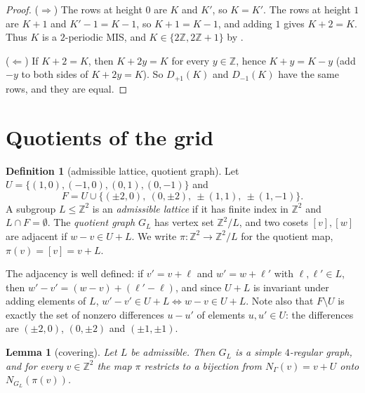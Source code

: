 \documentclass[11pt]{article}
\theoremstyle{plain}
\newtheorem{lemma}[lemma]{Lemma}
\theoremstyle{definition}
\newtheorem{definition}[definition]{Definition}
\theoremstyle{remark}
\newcommand{\Z}{\mathbb{Z}}
\newcommand{\Dg}[2]{D_{#1}(#2)}
\begin{document}
\begin{proof}
($\Rightarrow$) The rows at height $0$ are $K$ and $K'$, so $K = K'$. The rows at height $1$
are $K + 1$ and $K' - 1 = K - 1$, so $K + 1 = K - 1$, and adding $1$ gives $K + 2 = K$. Thus
$K$ is a $2$-periodic MIS, and $K \in \{2\Z, 2\Z+1\}$ by .

($\Leftarrow$) If $K + 2 = K$, then $K + 2y = K$ for every $y \in \Z$, hence
$K + y = K - y$ (add $-y$ to both sides of $K + 2y = K$). So $\Dg{+1}{K}$ and $\Dg{-1}{K}$
have the same rows, and they are equal.
\end{proof}

\section{Quotients of the grid}\label{sec:quotients}

\begin{definition}[admissible lattice, quotient graph]\label{def:quotient}
Let $U = \{(1,0), (-1,0), (0,1), (0,-1)\}$ and
\[
F = U \cup \{(\pm 2, 0),\ (0, \pm 2),\ \pm(1,1),\ \pm(1,-1)\}.
\]
A subgroup $L \le \Z^2$ is an \emph{admissible lattice} if it has finite index in $\Z^2$ and
$L \cap F = \emptyset$. The \emph{quotient graph} $G_L$ has vertex set $\Z^2/L$, and two
cosets $[v], [w]$ are adjacent if $w - v \in U + L$. We write $\pi : \Z^2 \to \Z^2/L$ for the
quotient map, $\pi(v) = [v] = v + L$.
\end{definition}

The adjacency is well defined: if $v' = v + \ell$ and $w' = w + \ell'$ with
$\ell, \ell' \in L$, then $w' - v' = (w - v) + (\ell' - \ell)$, and since $U + L$ is invariant
under adding elements of $L$, $w' - v' \in U + L \iff w - v \in U + L$. Note also that
$F \setminus U$ is exactly the set of nonzero differences $u - u'$ of elements
$u, u' \in U$: the differences are $(\pm 2, 0)$, $(0, \pm 2)$ and $(\pm 1, \pm 1)$.

\begin{lemma}[covering]\label{lem:covering}
Let $L$ be admissible. Then $G_L$ is a simple $4$-regular graph, and for every $v \in \Z^2$
the map $\pi$ restricts to a bijection from $N_\Gamma(v) = v + U$ onto $N_{G_L}(\pi(v))$.
\end{lemma}
\end{document}
